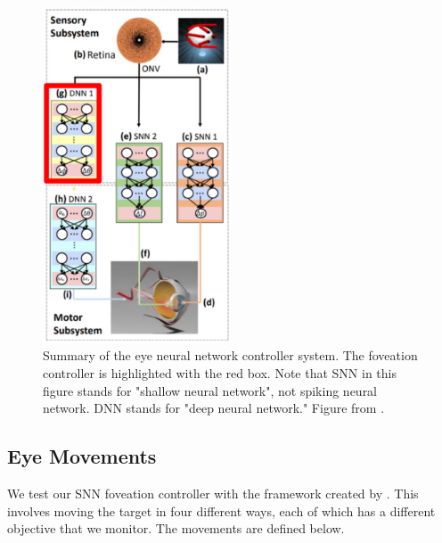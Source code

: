 \documentclass[../taasin.tex]{subfiles}
\begin{document}
\begin{figure}[h]
    \centering
    \includegraphics[width=0.5\textwidth]{figures/subsystem_summary2.pdf}
    \caption{Summary of the eye neural network controller system. The foveation controller is highlighted with the red box. Note that SNN in this figure stands for "shallow neural network", not spiking neural network. DNN stands for "deep neural network." Figure from \cite{Arjun}. }
    \label{fig:eye controller summary}
\end{figure}


\subsection{Eye Movements}

We test our SNN foveation controller with the framework created by \cite{Arjun}. This involves moving the target in four different ways, each of which has a different objective that we monitor. The movements are defined below.
\end{document}

